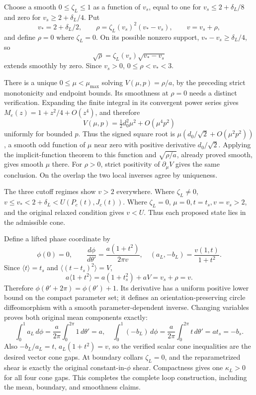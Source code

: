 \documentclass[10pt,a4paper]{article}
\begin{document}
Choose a smooth \(0\le\zeta_L\le1\) as a function of \(v_s\), equal to one for \(v_s\le2+\delta_L/8\) and zero for \(v_s\ge2+\delta_L/4\). Put \[
v_*=2+\delta_L/2,\qquad
\rho=\zeta_L(v_s)^2(v_*-v_s),\qquad
v=v_s+\rho,
\] and define \(\rho=0\) where \(\zeta_L=0\). On its possible nonzero support, \(v_*-v_s\ge\delta_L/4\), so \[
\sqrt\rho=\zeta_L(v_s)\sqrt{v_*-v_s}
\] extends smoothly by zero. Since \(v_s>0\), \(0\le\rho<v_*<3\).

There is a unique \(0\le\mu<\mu_{\max}\) solving \(V(\mu,p)=\rho/a\), by the preceding strict monotonicity and endpoint bounds. Its smoothness at \(\rho=0\) needs a distinct verification. Expanding the finite integral in its convergent power series gives \(M_e(z)=1+z^2/4+O(z^4)\), and therefore \[
V(\mu,p)=\tfrac12d_0^2\mu^2+O(\mu^4p^2)
\] uniformly for bounded \(p\). Thus the signed square root is \(\mu(d_0/\sqrt2+O(\mu^2p^2))\), a smooth odd function of \(\mu\) near zero with positive derivative \(d_0/\sqrt2\). Applying the implicit-function theorem to this function and \(\sqrt{\rho/a}\), already proved smooth, gives smooth \(\mu\) there. For \(\rho>0\), strict positivity of \(\partial_\mu V\) gives the same conclusion. On the overlap the two local inverses agree by uniqueness.

The three cutoff regimes show \(v>2\) everywhere. Where \(\zeta_L\ne0\), \(v\le v_*<2+\delta_L<U(P_c(t),J_c(t))\). Where \(\zeta_L=0\), \(\mu=0,t=t_s,v=v_s>2\), and the original relaxed condition gives \(v<U\). Thus each proposed state lies in the admissible cone.

Define a lifted phase coordinate by \[
\phi(0)=0,\qquad
\frac{d\phi}{d\theta'}=\frac{a(1+t^2)}{2\pi v},
\quad
(a_L,-b_L)=\frac{v(1,t)}{1+t^2}.
\] Since \(\langle t\rangle=t_s\) and \(\langle(t-t_s)^2\rangle=V\), \[
a\langle1+t^2\rangle=a(1+t_s^2)+aV=v_s+\rho=v.
\] Therefore \(\phi(\theta'+2\pi)=\phi(\theta')+1\). Its derivative has a uniform positive lower bound on the compact parameter set; it defines an orientation-preserving circle diffeomorphism with a smooth parameter-dependent inverse. Changing variables proves both original mean components exactly: \[
\int_0^1a_L\,d\phi
=\frac a{2\pi}\int_0^{2\pi}1\,d\theta'=a,
\quad
\int_0^1(-b_L)\,d\phi
=\frac a{2\pi}\int_0^{2\pi}t\,d\theta'=at_s=-b_s.
\] Also \(-b_L/a_L=t\), \(a_L(1+t^2)=v\), so the verified scalar cone inequalities are the desired vector cone gaps. At boundary collars \(\zeta_L=0\), and the reparametrized shear is exactly the original constant-in-\(\phi\) shear. Compactness gives one \(\kappa_L>0\) for all four cone gaps. This completes the complete loop construction, including the mean, boundary, and smoothness claims.
\end{document}
